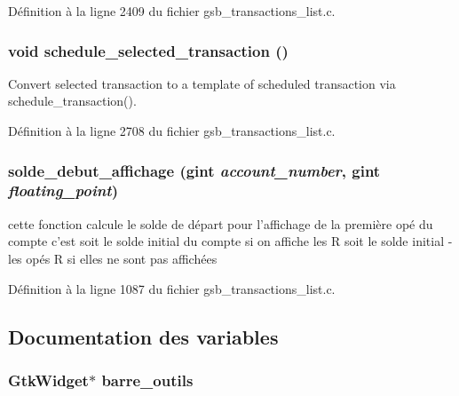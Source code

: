 Définition à la ligne 2409 du fichier gsb\_\-transactions\_\-list.c.

\subsubsection[{schedule\_\-selected\_\-transaction}]{\setlength{\rightskip}{0pt plus 5cm}void schedule\_\-selected\_\-transaction ()}\label{gsb__transactions__list_8c_a57f2d9faad61b1154270e444656bd275}
Convert selected transaction to a template of scheduled transaction via schedule\_\-transaction(). 

Définition à la ligne 2708 du fichier gsb\_\-transactions\_\-list.c.

\subsubsection[{solde\_\-debut\_\-affichage}]{ solde\_\-debut\_\-affichage (gint {\em account\_\-number}, \/  gint {\em floating\_\-point})}\label{gsb__transactions__list_8c_ad8b68b6ef2fd8238d726e11c981fc701}
cette fonction calcule le solde de départ pour l'affichage de la première opé du compte c'est soit le solde initial du compte si on affiche les R soit le solde initial -\/ les opés R si elles ne sont pas affichées 

Définition à la ligne 1087 du fichier gsb\_\-transactions\_\-list.c.



\subsection{Documentation des variables}
\subsubsection[{barre\_\-outils}]{\setlength{\rightskip}{0pt plus 5cm}GtkWidget$\ast$ {\bf barre\_\-outils}}\label{gsb__transactions__list_8c_a268b1e31b413c512d03776ae10b8f785}


